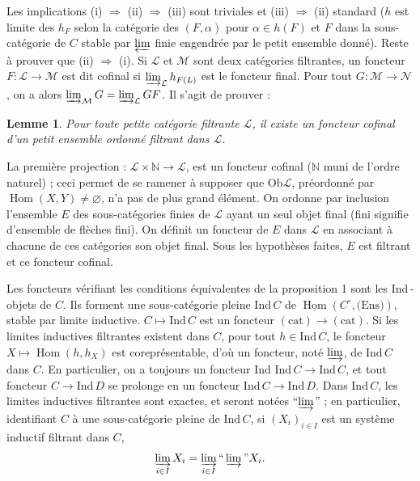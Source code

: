 \documentclass[12pt]{amsart}
\theoremstyle{plain}
\newtheorem{lem}{Lemme}
\theoremstyle{definition}
\DeclareMathOperator{\Hom}{Hom}
\newcommand{\Ind}{\text{Ind}\,}
\newcommand{\cL}{\mathcal{L}}
\newcommand{\cM}{\mathcal{M}}
\newcommand{\cN}{\mathcal{N}}
\newcommand{\cD}{D}
\begin{document}
Les implications (i) $\Rightarrow$ (ii) $\Rightarrow$ (iii) sont triviales et (iii) $\Rightarrow$ (ii) standard ($h$ est limite des $h_{F}$ selon la cat\'egorie des $(F,\alpha)$ pour $\alpha \in h(F)$ et $F$ dans la sous-cat\'egorie de $C$ stable par $\varprojlim$ finie engendr\'ee par le petit ensemble donn\'e). Reste \`a prouver que (ii) $\Rightarrow$ (i). Si $\cL$ et $\cM$ sont deux cat\'egories filtrantes, un foncteur $F: \cL \to \cM$ est dit cofinal si $\varinjlim_{\cL} h_{F(L)}$ est le foncteur final. Pour tout $G: \cM \to \cN$, on a alors $\varinjlim_{\cM} G = \varinjlim_{\cL} GF$. Il s'agit de prouver :

\begin{lem}
Pour toute petite cat\'egorie filtrante $\cL$, il existe un foncteur cofinal d'un petit ensemble ordonn\'e filtrant dans $\cL$.
\end{lem}

La premi\`ere projection : $\cL \times \mathbb{N} \to \cL$, est un foncteur cofinal ($\mathbb{N}$ muni de l'ordre naturel) ; ceci permet de se ramener \`a supposer que $\text{Ob}\cL$, pr\'eordonn\'e par $\Hom(X,Y) \neq \varnothing$, n'a pas de plus grand \'el\'ement. On ordonne par inclusion l'ensemble $E$ des sous-cat\'egories finies de $\cL$ ayant un seul objet final (fini signifie d'ensemble de fl\`eches fini). On d\'efinit un foncteur de $E$ dans $\cL$ en associant \`a chacune de ces cat\'egories son objet final. Sous les hypoth\`eses faites, $E$ est filtrant et ce foncteur cofinal.

Les foncteurs v\'erifiant les conditions \'equivalentes de la proposition 1 sont les $\Ind$-objets de $C$. Ils forment une sous-cat\'egorie pleine $\Ind C$ de $\underline{\Hom}(C^{\circ},\text{(Ens)})$, stable par limite inductive. $C \mapsto \Ind C$ est un foncteur $(\text{cat}) \to (\text{cat})$. Si les limites inductives filtrantes existent dans $C$, pour tout $h \in \Ind C$, le foncteur $X \mapsto \Hom(h,h_{X})$ est corepr\'esentable, d'o\`u un foncteur, not\'e $\varinjlim$, de $\Ind C$ dans $C$. En particulier, on a toujours un foncteur $\Ind\,\Ind C \to \Ind C$, et tout foncteur $C \to \Ind\cD$ se prolonge en un foncteur $\Ind C \to \Ind\cD$. Dans $\Ind C$, les limites inductives filtrantes sont exactes, et seront not\'ees ``$\varinjlim$'' ; en particulier, identifiant $C$ \`a une sous-cat\'egorie pleine de $\Ind C$, si $(X_{i})_{i \in I}$ est un syst\`eme inductif filtrant dans $C$,
\[
\varinjlim_{i \in I} X_{i} = \varinjlim_{i \in I} \text{``}\varinjlim\text{''} X_{i}.
\]
\end{document}
